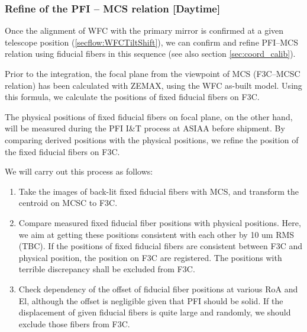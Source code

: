 \subsubsection{Refine of the PFI -- MCS relation [Daytime]}\label{secflow:mcs2f3c}
Once the alignment of WFC with the primary mirror is confirmed at a given telescope position (\ref{secflow:WFCTiltShift}), we can confirm and refine PFI--MCS relation using fiducial fibers in this sequence (see also section \ref{sec:coord_calib}).

Prior to the integration, the focal plane from the viewpoint of MCS (F3C--MCSC relation) has been calculated with ZEMAX, using the WFC as-built model.
Using this formula, we calculate the positions of fixed fiducial fibers on F3C.

The physical positions of fixed fiducial fibers on focal plane, on the other hand, will be measured during the PFI I\&T process at ASIAA before shipment.
By comparing derived positions with the physical positions, we refine the position of the fixed fiducial fibers on F3C.

We will carry out this process as follows:
\begin{enumerate}
\item Take the images of back-lit fixed fiducial fibers with MCS, and transform the centroid on MCSC to F3C.
\item Compare measured fixed fiducial fiber positions with physical positions.
Here, we aim at getting these positions consistent with each other by 10 um RMS (TBC).
If the positions of fixed fiducial fibers are consistent between F3C and physical position, the position on F3C are registered.
The positions with terrible discrepancy shall be excluded from F3C.
\item Check dependency of the offset of fiducial fiber positions at various RoA and El, although the offset is negligible given that PFI should be solid.
If the displacement of given fiducial fibers is quite large and randomly, we should exclude those fibers from F3C.

\end{enumerate}

